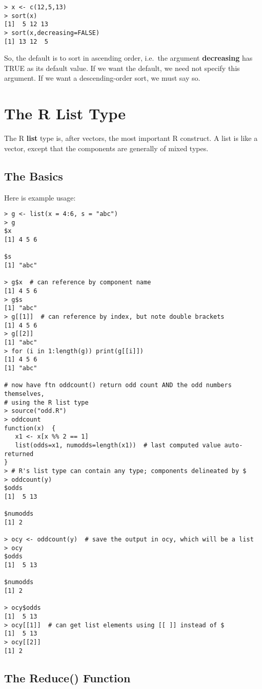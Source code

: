\begin{lstlisting}
> x <- c(12,5,13)
> sort(x)
[1]  5 12 13
> sort(x,decreasing=FALSE)
[1] 13 12  5
\end{lstlisting}

So, the default is to sort in ascending order, i.e.\ the argument {\bf
decreasing} has TRUE as its default value.  If we want the default, 
we need not specify this argument.  If we want a descending-order sort,
we must say so.

\section{The R List Type}

The R {\bf list} type is, after vectors, the most important R construct.
A list is like a vector, except that the components are generally of
mixed types.

\subsection{The Basics}

Here is example usage:

\begin{lstlisting}
> g <- list(x = 4:6, s = "abc")
> g
$x
[1] 4 5 6

$s
[1] "abc"

> g$x  # can reference by component name
[1] 4 5 6
> g$s
[1] "abc"
> g[[1]]  # can reference by index, but note double brackets
[1] 4 5 6
> g[[2]]
[1] "abc"
> for (i in 1:length(g)) print(g[[i]])
[1] 4 5 6
[1] "abc"

# now have ftn oddcount() return odd count AND the odd numbers themselves, 
# using the R list type
> source("odd.R")
> oddcount
function(x)  {
   x1 <- x[x %% 2 == 1]
   list(odds=x1, numodds=length(x1))  # last computed value auto-returned
}
> # R's list type can contain any type; components delineated by $
> oddcount(y)
$odds
[1]  5 13

$numodds
[1] 2

> ocy <- oddcount(y)  # save the output in ocy, which will be a list
> ocy  
$odds
[1]  5 13

$numodds
[1] 2

> ocy$odds
[1]  5 13
> ocy[[1]]  # can get list elements using [[ ]] instead of $
[1]  5 13
> ocy[[2]]
[1] 2
\end{lstlisting}

\subsection{The Reduce() Function}

